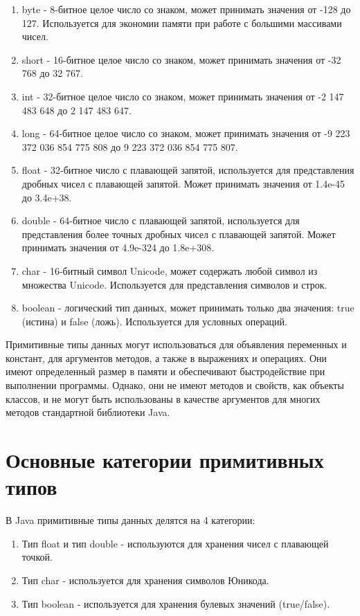 \begin{enumerate}
    \item byte - 8-битное целое число со знаком, может принимать значения от -128 до 127. Используется для экономии памяти при работе с большими массивами чисел.
    \item short - 16-битное целое число со знаком, может принимать значения от -32 768 до 32 767.
    \item int - 32-битное целое число со знаком, может принимать значения от -2 147 483 648 до 2 147 483 647.
    \item long - 64-битное целое число со знаком, может принимать значения от -9 223 372 036 854 775 808 до 9 223 372 036 854 775 807.
    \item float - 32-битное число с плавающей запятой, используется для представления дробных чисел с плавающей запятой. Может принимать значения от 1.4e-45 до 3.4e+38.
    \item double - 64-битное число с плавающей запятой, используется для представления более точных дробных чисел с плавающей запятой. Может принимать значения от 4.9e-324 до 1.8e+308.
    \item char - 16-битный символ Unicode, может содержать любой символ из множества Unicode. Используется для представления символов и строк.
    \item boolean - логический тип данных, может принимать только два значения: true (истина) и false (ложь). Используется для условных операций.
\end{enumerate}

Примитивные типы данных могут использоваться для объявления переменных и констант, для аргументов методов, а также в выражениях и операциях. Они имеют определенный размер в памяти и обеспечивают быстродействие при выполнении программы. Однако, они не имеют методов и свойств, как объекты классов, и не могут быть использованы в качестве аргументов для многих методов стандартной библиотеки Java.

\section{Основные категории примитивных типов}

В Java примитивные типы данных делятся на 4 категории:

\begin{enumerate}
     типы (byte, short, int, long) - используются для хранения целочисленных значений.
    \item Тип float и тип double - используются для хранения чисел с плавающей точкой.
    \item Тип char - используется для хранения символов Юникода.
    \item Тип boolean - используется для хранения булевых значений (true/false).
\end{enumerate}

